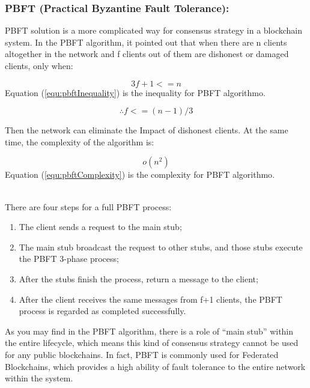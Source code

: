 \documentclass[runningheads]{llncs}
\begin{document}
\subsubsection{PBFT (Practical Byzantine Fault Tolerance):}

PBFT solution is a more complicated way for consensus strategy in a blockchain system. In the PBFT algorithm, it pointed out that when there are n clients altogether in the network and f clients out of them are dishonest or damaged clients, only when:

\begin{equation}
	3f+1<=n\label{equ:pbftInequality}
\end{equation}
Equation (\ref{equ:pbftInequality}) is the inequality for PBFT algorithmo\cite{castro1999practical}.

\begin{equation}
	\therefore f<= (n-1)/3
\end{equation}


Then the network can eliminate the Impact of dishonest clients. At the same time, the complexity of the algorithm is:

\begin{equation}
	o(n^2)\label{equ:pbftComplexity}
\end{equation}
Equation (\ref{equ:pbftComplexity}) is the complexity for PBFT algorithmo\cite{castro1999practical}.

~\\
There are four steps for a full PBFT process:

\begin{enumerate}
	\item The client sends a request to the main stub;
	\item The main stub broadcast the request to other stubs, and those stubs execute the PBFT 3-phase process;
	\item After the stubs finish the process, return a message to the client;
	\item After the client receives the same messages from f+1 clients, the PBFT process is regarded as completed successfully.
\end{enumerate}

As you may find in the PBFT algorithm, there is a role of “main stub” within the entire lifecycle, which means this kind of consensus strategy cannot be used for any public blockchains. In fact, PBFT is commonly used for Federated Blockchains, which provides a high ability of fault tolerance to the entire network within the system.
\end{document}
